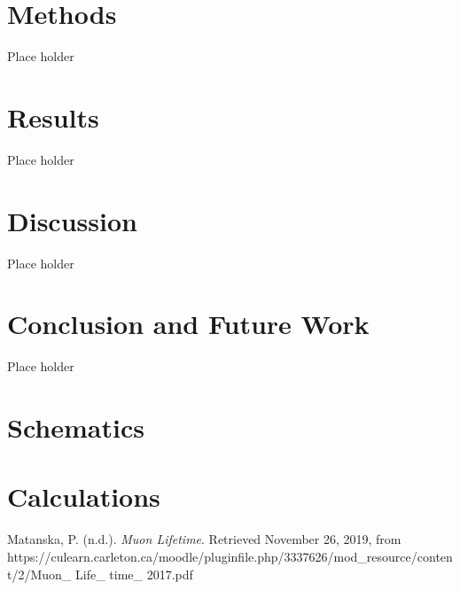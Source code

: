 \documentclass[11pt, letterpaper]{article}
\begin{document}
\section{Methods}
\tab
Place holder


\section{Results}
\tab
Place holder


\section{Discussion}
\tab
Place holder


\section{Conclusion and Future Work}
\tab
Place holder


\newpage

\appendix

\section{Schematics}

\newpage

\section{Calculations}

\newpage

\begin{thebibliography}{9}

Matanska, P. (n.d.). \textit{Muon Lifetime}. Retrieved November 26, 2019, from https:\slash \slash culearn.carleton.ca\slash moodle\slash pluginfile.php\slash 3337626\slash mod\_resource\slash content\slash 2\slash Muon\_ Life\_ time\_ 2017.pdf


\end{thebibliography}
\end{document}

